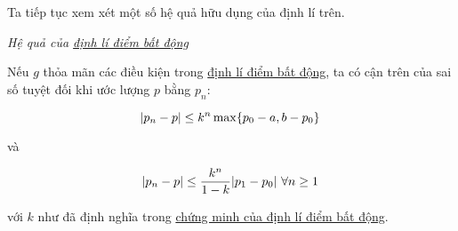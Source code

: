\documentclass[../../Lectures]{subfiles}
\begin{document}
Ta tiếp tục xem xét một số hệ quả hữu dụng của định lí trên.

\begin{coro}
    \emph{Hệ quả của \hyperref[thm:fixed_point]{định lí điểm bất động}}

    Nếu \(g\) thỏa mãn các điều kiện trong \hyperref[thm:fixed_point]{định lí
    điểm bất động}, ta có cận trên của sai số tuyệt đối khi ước lượng \(p\) bằng
    \(p_n\):

    \begin{equation}\label{ieq:coro:thm:fixed_point_1}
        \abs{p_n - p} \leq k^n \max \{p_0 - a, b - p_0\}
    \end{equation}

    và

    \begin{equation}\label{ieq:coro:thm:fixed_point_2}
        \abs{p_n - p} \leq \frac{k^n}{1 - k} \abs{p_1 - p_0} \, \forall n \geq 1
    \end{equation}

    với \(k\) như đã định nghĩa trong \hyperref[proof:thm:fixed_point]{chứng
    minh của định lí điểm bất động}.
\end{coro}
\end{document}
